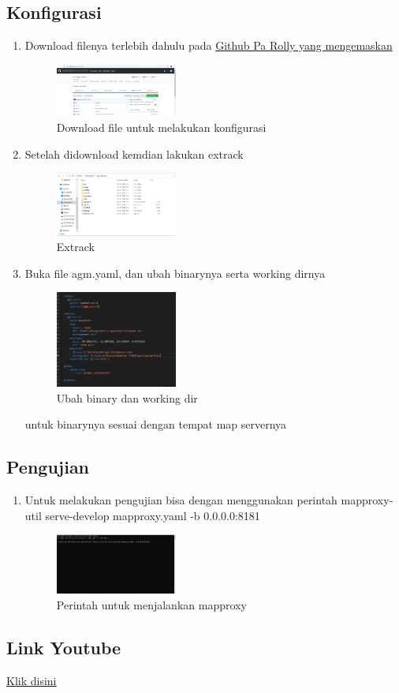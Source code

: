 \subsection{Konfigurasi}
\begin{enumerate}
    \item Download filenya terlebih dahulu pada \href{https://github.com/awangga/gede}{Github Pa Rolly yang mengemaskan}
    \hfill\break
    \begin{figure}[H]
		\includegraphics[width=4cm]{figures/1174095/5/Capture3.png}
		\centering
		\caption{Download file untuk melakukan konfigurasi}
    \end{figure}
    \item Setelah didownload kemdian lakukan extrack
    \hfill\break
    \begin{figure}[H]
		\includegraphics[width=4cm]{figures/1174095/5/Capture4.png}
		\centering
		\caption{Extrack}
    \end{figure}
    \item Buka file agm.yaml, dan ubah binarynya serta working dirnya
    \hfill\break
    \begin{figure}[H]
		\includegraphics[width=4cm]{figures/1174095/5/Capture1.png}
		\centering
		\caption{Ubah binary dan working dir}
    \end{figure}
    untuk binarynya sesuai dengan tempat map servernya
\end{enumerate}
\subsection{Pengujian}
\begin{enumerate}
    \item Untuk melakukan pengujian bisa dengan menggunakan perintah mapproxy-util serve-develop mapproxy.yaml -b 0.0.0.0:8181
    \hfill\break
    \begin{figure}[H]
		\includegraphics[width=4cm]{figures/1174095/5/Capture5.png}
		\centering
		\caption{Perintah untuk menjalankan mapproxy}
    \end{figure}
\end{enumerate}
\subsection{Link Youtube}
\href{https://youtu.be/c1XnYYFvGLU}{Klik disini}